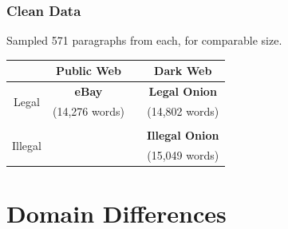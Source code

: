 \documentclass[t,xcolor={svgnames,table}]{beamer}
\begin{document}
\begin{frame}
	\frametitle{Clean Data}

	Sampled 571 paragraphs from each, for comparable size.
	
	\begin{center}
	\def\arraystretch{2}
	\begin{tabular}{c|ccc}
	& Public Web && Dark Web \\ 
	\hline
	\multirow{2}{*}{Legal} & \textbf{\color{yellow} eBay} && \textbf{\color{green} Legal Onion} \\
	& (14,276 words) && (14,802 words) \\\\
	\multirow{2}{*}{Illegal} &&& \textbf{\color{red} Illegal Onion} \\
	&&& (15,049 words)
	\end{tabular}
	\end{center}
\end{frame}

\section{Domain Differences}
\end{document}
